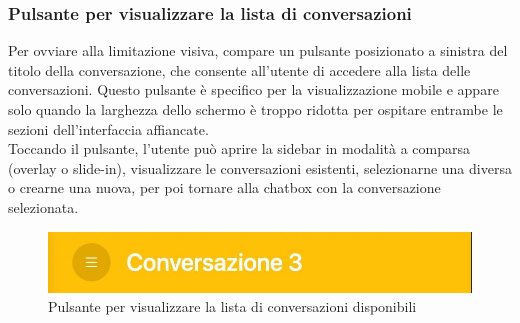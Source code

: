 \subsubsection{Pulsante per visualizzare la lista di conversazioni}
Per ovviare alla limitazione visiva, compare un pulsante posizionato a sinistra del titolo della conversazione, che consente all’utente di accedere alla lista delle conversazioni. Questo pulsante è specifico per la visualizzazione mobile e appare solo quando la larghezza dello schermo è troppo ridotta per ospitare entrambe le sezioni dell’interfaccia affiancate. \\
Toccando il pulsante, l’utente può aprire la sidebar in modalità a comparsa (overlay o slide-in), visualizzare le conversazioni esistenti, selezionarne una diversa o crearne una nuova, per poi tornare alla chatbox con la conversazione selezionata.
\begin{figure}[H]
\centering
\includegraphics[width=1\textwidth]{contents/img/toggle.jpg}
\caption{Pulsante per visualizzare la lista di conversazioni disponibili}
\end{figure}

